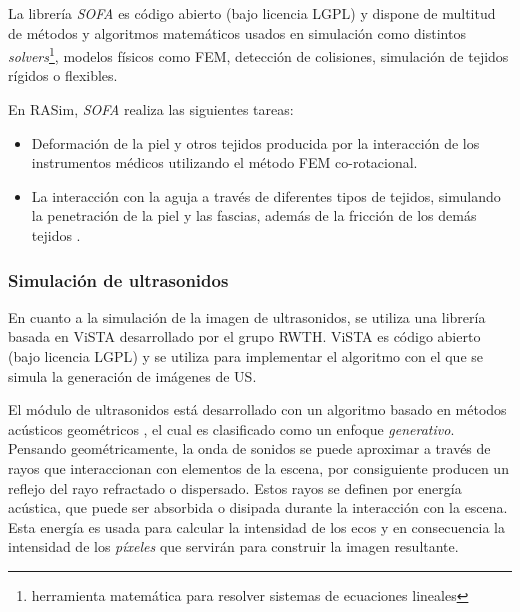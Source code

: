 La librería \emph{SOFA} es código abierto (bajo licencia \ac{LGPL}) y dispone de multitud de métodos y algoritmos matemáticos usados en simulación como distintos \emph{solvers}\footnote{herramienta matemática para resolver sistemas de ecuaciones lineales}, modelos físicos como \ac{FEM}, detección de colisiones, simulación de tejidos rígidos o flexibles.

En \ac{RASim}, \emph{SOFA} realiza las siguientes tareas:
\begin{itemize}
    \item Deformación de la piel y otros tejidos producida por la interacción de los instrumentos médicos utilizando el método \ac{FEM} co-rotacional.
    \item La interacción con la aguja a través de diferentes tipos de tejidos, simulando la penetración de la piel y las fascias, además de la fricción de los demás tejidos \cite{needleinsertion}.
    
\end{itemize}

\subsubsection{Simulación de ultrasonidos} 

En cuanto a la simulación de la imagen de ultrasonidos, se utiliza una librería basada en \ac{ViSTA} desarrollado por el grupo \ac{RWTH}. \ac{ViSTA} es código abierto (bajo licencia \ac{LGPL}) y se utiliza para implementar el algoritmo con el que se simula la generación de imágenes de \ac{US}.

El módulo de ultrasonidos está desarrollado con un algoritmo basado en métodos acústicos geométricos \cite{Law2015}, el cual es clasificado como un enfoque \emph{generativo}. Pensando geométricamente, la onda de sonidos se puede aproximar a través de rayos que interaccionan con elementos de la escena, por consiguiente producen un reflejo del rayo refractado o dispersado. Estos rayos se definen por energía acústica, que puede ser absorbida o disipada durante la interacción con la escena. Esta energía es usada para calcular la intensidad de los ecos y en consecuencia la intensidad de los \emph{píxeles} que servirán para construir la imagen resultante.

